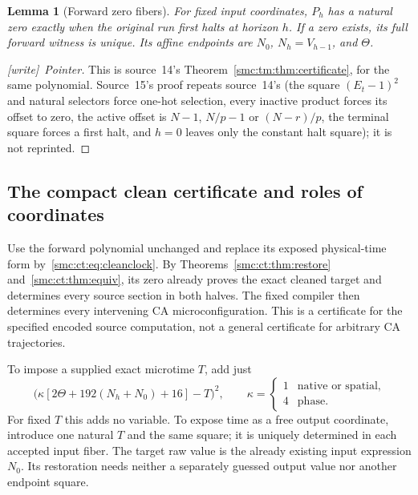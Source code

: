 \documentclass[11pt,letterpaper]{article}
\numberwithin{equation}{section}
\newtheorem{lemma}[theorem]{Lemma}
\theoremstyle{definition}
\theoremstyle{remark}
\newcommand{\wtag}{\textup{[write]}}
\begin{document}
\begin{lemma}[Forward zero fibers]\label{smc:ct:lem:forwardzero}
For fixed input coordinates, $P_h$ has a natural zero exactly when the original run first halts at horizon $h$. If a zero exists, its full forward witness is unique. Its affine endpoints are $N_0$, $N_h=V_{h-1}$, and $\Theta$.
\end{lemma}
\begin{proof}[\wtag\ Pointer]
This is source~14's Theorem~\ref{smc:tm:thm:certificate}, for the same polynomial. Source~15's proof repeats source~14's (the square $(E_t-1)^2$ and natural selectors force one-hot selection, every inactive product forces its offset to zero, the active offset is $N-1$, $N/p-1$ or $(N-r)/p$, the terminal square forces a first halt, and $h=0$ leaves only the constant halt square); it is not reprinted.
\end{proof}

\subsection{The compact clean certificate and roles of coordinates}

Use the forward polynomial unchanged and replace its exposed physical-time form by~\eqref{smc:ct:eq:cleanclock}. By Theorems~\ref{smc:ct:thm:restore} and~\ref{smc:ct:thm:equiv}, its zero already proves the exact cleaned target and determines every source section in both halves. The fixed compiler then determines every intervening CA microconfiguration. This is a certificate for the specified encoded source computation, not a general certificate for arbitrary CA trajectories.

To impose a supplied exact microtime $T$, add just
\begin{equation}\label{smc:ct:eq:timesquare}
\bigl(\kappa[2\Theta+192(N_h+N_0)+16]-T\bigr)^2,\qquad
\kappa=\begin{cases}1&\text{native or spatial},\\4&\text{phase}.
\end{cases}
\end{equation}
For fixed $T$ this adds no variable. To expose time as a free output coordinate, introduce one natural $T$ and the same square; it is uniquely determined in each accepted input fiber. The target raw value is the already existing input expression $N_0$. Its restoration needs neither a separately guessed output value nor another endpoint square.
\end{document}
